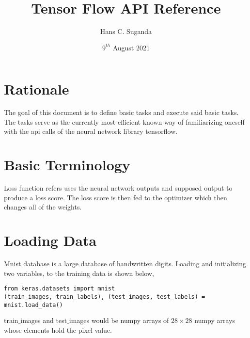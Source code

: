 \documentclass[a4paper, 12pt]{report}
\begin{document}
\title{Tensor Flow API Reference}
\author{Hans C. Suganda}
\date{$9^{th}$ August 2021}
\maketitle
\newpage



\begin{center}
\section*{Rationale}
\begin{comment}
\end{comment}
The goal of this document is to define basic tasks and execute said basic tasks. The tasks serve as the currently most efficient known way of familiarizing oneself with the api calls of the neural network library tensorflow.
\section*{Basic Terminology}
\begin{comment}
\end{comment}
Loss function refers uses the neural network outputs and supposed output to produce a loss score. The loss score is then fed to the optimizer which then changes all of the weights. 
\section*{Loading Data}
\begin{comment}
\end{comment}
Mnist database is a large database of handwritten digits. Loading and initializing two variables, to the training data is shown below,
\begin{lstlisting}
from keras.datasets import mnist
(train_images, train_labels), (test_images, test_labels) = mnist.load_data() 
\end{lstlisting}
train$\_$images and test$\_$images would be numpy arrays of $28\times 28$ numpy arrays whose elements hold the pixel value.

\end{center}
\end{document}
